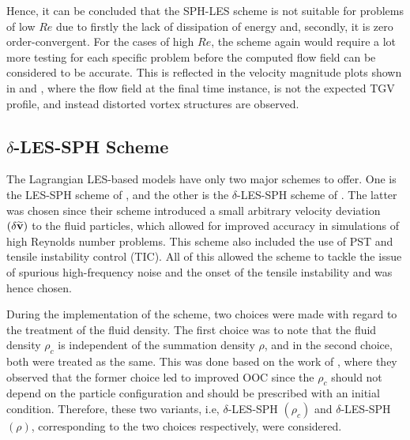 Hence, it can be concluded that the SPH-LES scheme is not suitable for problems of low $Re$ due to firstly the lack of dissipation of energy and, secondly, it is zero order-convergent. For the cases of high $Re$, the scheme again would require a lot more testing for each specific problem before the computed flow field can be considered to be accurate. This is reflected in the velocity magnitude plots shown in  and , where the flow field at the final time instance, is not the expected TGV profile, and instead distorted vortex structures are observed.


\subsection[delta-LES-SPH Scheme]{$\delta$-LES-SPH Scheme}
The Lagrangian LES-based models have only two major schemes to offer. One is the LES-SPH scheme of \cite{DiMascio2017}, and the other is the $\delta$-LES-SPH scheme of \cite{Colagrossi2021QuasiLagrangian}.
The latter was chosen since their scheme introduced a small arbitrary velocity deviation $(\delta\widetilde{\mathbf{v}})$ to the fluid particles, which allowed for improved accuracy in simulations of high Reynolds number problems. This scheme also included the use of PST and tensile instability control (TIC). All of this allowed the scheme to tackle the issue of spurious high-frequency noise and the onset of the tensile instability and was hence chosen.

During the implementation of the scheme, two choices were made with regard to the treatment of the fluid density. The first choice was to note that the fluid density $\rho_c$ is independent of the summation density $\rho$, and in the second choice, both were treated as the same. This was done based on the work of \cite{Negi2022Techniques}, where they observed that the former choice led to improved OOC since the $\rho_c$ should not depend on the particle configuration and should be prescribed with an initial condition. Therefore, these two variants, i.e, $\delta$-LES-SPH $(\rho_c)$ and $\delta$-LES-SPH $(\rho)$, corresponding to the two choices respectively, were considered.

